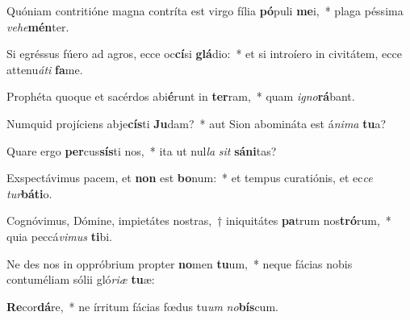 \item Quóniam contritióne magna contríta est virgo fília \textbf{pó}puli \textbf{me}i,~* plaga péssima \textit{ve}\textit{he}\textbf{mén}ter.
\item Si egréssus fúero ad agros, ecce oc\textbf{cí}si \textbf{glá}dio:~* et si introíero in civitátem, ecce attenu\textit{á}\textit{ti} \textbf{fa}me.
\item Prophéta quoque et sacérdos abi\textbf{é}runt in \textbf{ter}ram,~* quam \textit{i}\textit{gno}\textbf{rá}bant.
\item Numquid projíciens abje\textbf{cís}ti \textbf{Ju}dam?~* aut Sion abomináta est á\textit{ni}\textit{ma} \textbf{tu}a?
\item Quare ergo \textbf{per}cus\textbf{sís}ti nos,~* ita ut nul\textit{la} \textit{sit} \textbf{sá}\textbf{ni}tas?
\item Exspectávimus pacem, et \textbf{non} est \textbf{bo}num:~* et tempus curatiónis, et ec\textit{ce} \textit{tur}\textbf{bá}\textbf{ti}o.
\item Cognóvimus, Dómine, impietátes nostras,~† iniquitátes \textbf{pa}trum nos\textbf{tró}rum,~* quia peccá\textit{vi}\textit{mus} \textbf{ti}bi.
\item Ne des nos in oppróbrium propter \textbf{no}men \textbf{tu}um,~* neque fácias nobis contuméliam sólii gló\textit{ri}\textit{æ} \textbf{tu}æ:
\item \textbf{Re}cor\textbf{dá}re,~* ne írritum fácias fœdus tu\textit{um} \textit{no}\textbf{bís}cum.
